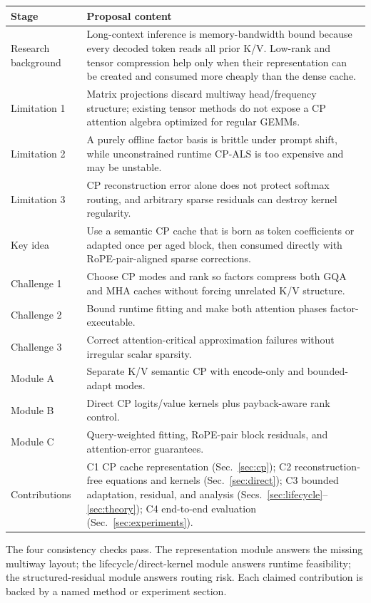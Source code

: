 \documentclass[11pt]{article}
\begin{document}
\small
\renewcommand{\arraystretch}{1.18}
\begin{tabularx}{\textwidth}{@{}p{3.35cm}X@{}}
\toprule
\textbf{Stage} & \textbf{Proposal content} \\
\midrule
Research background & Long-context inference is memory-bandwidth bound because every decoded token
reads all prior K/V. Low-rank and tensor compression help only when their representation can be
created and consumed more cheaply than the dense cache. \\
Limitation 1 & Matrix projections discard multiway head/frequency structure; existing tensor methods
do not expose a CP attention algebra optimized for regular GEMMs. \\
Limitation 2 & A purely offline factor basis is brittle under prompt shift, while unconstrained
runtime CP-ALS is too expensive and may be unstable. \\
Limitation 3 & CP reconstruction error alone does not protect softmax routing, and arbitrary sparse
residuals can destroy kernel regularity. \\
Key idea & Use a semantic CP cache that is born as token coefficients or adapted once per aged block,
then consumed directly with RoPE-pair-aligned sparse corrections. \\
Challenge 1 & Choose CP modes and rank so factors compress both GQA and MHA caches without forcing
unrelated K/V structure. \\
Challenge 2 & Bound runtime fitting and make both attention phases factor-executable. \\
Challenge 3 & Correct attention-critical approximation failures without irregular scalar sparsity. \\
Module A & Separate K/V semantic CP with encode-only and bounded-adapt modes. \\
Module B & Direct CP logits/value kernels plus payback-aware rank control. \\
Module C & Query-weighted fitting, RoPE-pair block residuals, and attention-error guarantees. \\
Contributions & C1 CP cache representation (Sec.~\ref{sec:cp}); C2 reconstruction-free equations and
kernels (Sec.~\ref{sec:direct}); C3 bounded adaptation, residual, and analysis
(Secs.~\ref{sec:lifecycle}--\ref{sec:theory}); C4 end-to-end evaluation
(Sec.~\ref{sec:experiments}). \\
\bottomrule
\end{tabularx}
\normalsize

The four consistency checks pass. The representation module answers the missing multiway layout;
the lifecycle/direct-kernel module answers runtime feasibility; the structured-residual module
answers routing risk. Each claimed contribution is backed by a named method or experiment section.
\end{document}
